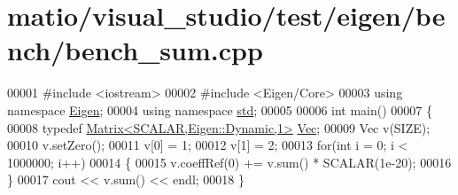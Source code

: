 \hypertarget{matio_2visual__studio_2test_2eigen_2bench_2bench__sum_8cpp_source}{}\section{matio/visual\+\_\+studio/test/eigen/bench/bench\+\_\+sum.cpp}
\label{matio_2visual__studio_2test_2eigen_2bench_2bench__sum_8cpp_source}

\begin{DoxyCode}
00001 \textcolor{preprocessor}{#include <iostream>}
00002 \textcolor{preprocessor}{#include <Eigen/Core>}
00003 \textcolor{keyword}{using namespace }\hyperlink{namespace_eigen}{Eigen};
00004 \textcolor{keyword}{using namespace }\hyperlink{namespacestd}{std};
00005 
00006 \textcolor{keywordtype}{int} main() 
00007 \{
00008   \textcolor{keyword}{typedef} \hyperlink{group___core___module_class_eigen_1_1_matrix}{Matrix<SCALAR,Eigen::Dynamic,1>} \hyperlink{group___core___module_class_eigen_1_1_matrix}{Vec};
00009   Vec v(SIZE);
00010   v.setZero();
00011   v[0] = 1;
00012   v[1] = 2;
00013   \textcolor{keywordflow}{for}(\textcolor{keywordtype}{int} i = 0; i < 1000000; i++)
00014   \{
00015     v.coeffRef(0) += v.sum() * SCALAR(1e-20);
00016   \}
00017   cout << v.sum() << endl;
00018 \}
\end{DoxyCode}
